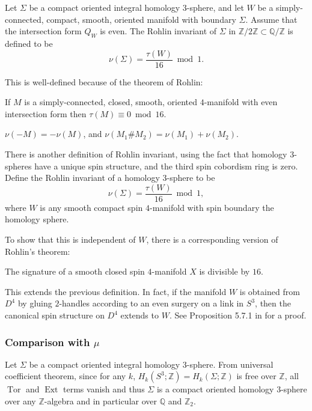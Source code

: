 \documentclass[twoside]{article}
\begin{document}
\begin{define}
	Let $\Sigma$ be a compact oriented integral homology $3$-sphere, and let $W$ be a simply-connected, compact, smooth, oriented manifold with boundary $\Sigma$. Assume that the intersection form $Q_W$ is even. The Rohlin invariant of $\Sigma$ in $\mathbb{Z}/2\mathbb{Z}\subset\mathbb{Q}/\mathbb{Z} $ is defined to be 
	\[
	\nu(\Sigma) = \frac{\tau(W)}{16} \bmod 1. 
	\]
\end{define}
This is well-defined because of the theorem of Rohlin:  
\begin{thm}
	If $M$ is a simply-connected, closed, smooth, oriented $4$-manifold with even intersection form then $\tau(M) \equiv 0 \bmod 16$. 
\end{thm}

\begin{prop}
	$\nu(-M) = -\nu(M)$, and $\nu(M_1 \#  M_2) = \nu(M_1) + \nu(M_2)$. 
\end{prop}



There is another definition of Rohlin invariant, using the fact that homology $3$-spheres have a unique spin structure, and the third spin cobordism ring is zero.  Define the Rohlin invariant of a homology $3$-sphere to be  
\[
\nu(\Sigma) = \frac{\tau(W)}{16} \bmod 1, 
\]
where $W$ is any smooth compact spin $4$-manifold with spin boundary the homology sphere. 

To show that this is independent of $W$, there is a corresponding version of Rohlin's theorem: 
\begin{thm}
	The signature of a smooth closed spin $4$-manifold $X$ is divisible by $16$. 
\end{thm}

This extends the previous definition. In fact, if the manifold $W$ is obtained from $D^4$ by gluing $2$-handles according to an even surgery on a link in $S^3$, then the canonical spin structure on $D^4$ extends to $W$. See Proposition 5.7.1 in \cite{gompf} for a proof. 


\subsubsection{Comparison with \texorpdfstring{$\mu$}{mu}}

Let $\Sigma$ be a compact oriented integral homology $3$-sphere. From universal coefficient theorem, since for any $k$,  $H_k(S^3;\mathbb{Z}) = H_k(\Sigma;\mathbb{Z})$ is free over $\mathbb{Z}$, all $\operatorname{Tor}$ and $\operatorname{Ext}$ terms vanish and thus $\Sigma$ is a compact oriented homology $3$-sphere over any $\mathbb{Z}$-algebra and in particular over $\mathbb{Q}$ and $\mathbb{Z}_2$. 
\end{document}

